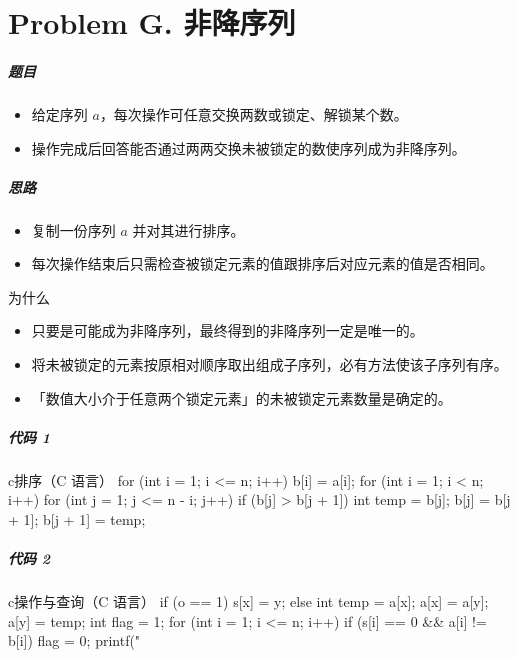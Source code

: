 \documentclass[
     aspectratio=169,                   %
]{beamer}
\begin{document}

\part{Problem G. 非降序列}
\begin{frame}
	\frametitle{题目}
	\begin{itemize}
		\item 给定序列 $a$，每次操作可任意交换两数或锁定、解锁某个数。
		\item 操作完成后回答能否通过两两交换未被锁定的数使序列成为非降序列。
	\end{itemize}
\end{frame}

\begin{frame}
	\frametitle{思路}
	\begin{itemize}
		\item 复制一份序列 $a$ 并对其进行排序。
		\item 每次操作结束后只需检查被锁定元素的值跟排序后对应元素的值是否相同。
	\end{itemize}
	\begin{block}{为什么}
		\begin{itemize}
			\item 只要是可能成为非降序列，最终得到的非降序列一定是唯一的。
			\item 将未被锁定的元素按原相对顺序取出组成子序列，必有方法使该子序列有序。
			\item 「数值大小介于任意两个锁定元素」的未被锁定元素数量是确定的。
		\end{itemize}
	\end{block}
\end{frame}

\begin{frame}[fragile]
	\frametitle{代码 1}
	\begin{codeblock}{c}{排序（C 语言）}
for (int i = 1; i <= n; i++) {
    b[i] = a[i];
}
for (int i = 1; i < n; i++) {
    for (int j = 1; j <= n - i; j++) {
        if (b[j] > b[j + 1]) {
            int temp = b[j]; b[j] = b[j + 1]; b[j + 1] = temp;
        }
    }
}
\end{codeblock}
\end{frame}

\begin{frame}[fragile]
	\frametitle{代码 2}
	\begin{codeblock}{c}{操作与查询（C 语言）}
if (o == 1) {
    s[x] = y;
}
else {
    int temp = a[x]; a[x] = a[y]; a[y] = temp;
}
int flag = 1;
for (int i = 1; i <= n; i++) {
    if (s[i] == 0 && a[i] != b[i]) {
        flag = 0;
    }
}
printf("%
\end{codeblock}
\end{frame}
\end{document}
